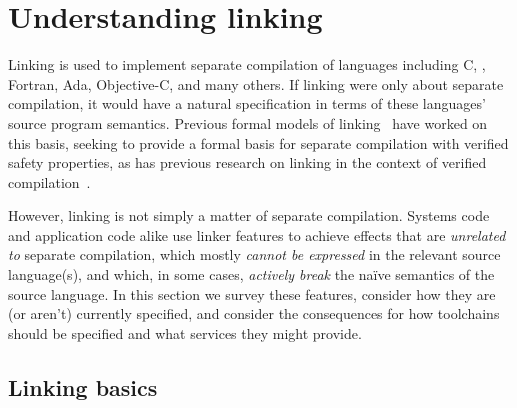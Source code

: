 \section{Understanding linking}

Linking is used to implement separate compilation 
of languages including C, \Cplusplus{}, Fortran, Ada, Objective-C, and
many others.
If linking were only about separate compilation, it would have a natural specification
in terms of these languages' source program semantics.
Previous formal models of linking~\cite{cardelli-program-1997, glew-type-safe-1999, machkasova-calculus-2000, wells-equational-2000, fagorzi-calculus-2007}
have worked on this basis, 
seeking to provide a formal basis for separate compilation with verified safety properties, as has
previous research on linking in the context of verified compilation~\cite{stewart-compositional-2015, kang-lightweight-2015}.

However, linking is not simply a matter of separate compilation.
Systems code and application code alike 
use linker features to achieve effects that are \emph{unrelated to} separate compilation,
which mostly \emph{cannot be expressed} in the relevant source language(s), 
and which, in some cases, \emph{actively break} the na\"ive semantics of the source language.
In this section we survey these features,
consider how they are (or aren't) currently specified, 
and consider the consequences for 
how toolchains should be specified and what services they might provide.


% 
% 
% 


\subsection{Linking basics}

